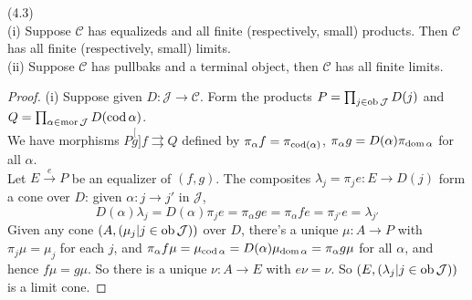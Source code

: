\documentclass[a4paper]{article}
\begin{document}
\begin{thm} (4.3)\\
    (i) Suppose $\mathcal{C}$ has equalizeds and all finite (respectively, small) products. Then $\mathcal{C}$ has all finite (respectively, small) limits.\\
    (ii) Suppose $\mathcal{C}$ has pullbaks and a terminal object, then $\mathcal{C}$ has all finite limits.
    \begin{proof}
        (i) Suppose given $D:\mathcal{J} \to \mathcal{C}$. Form the products $P=\prod_{j \in \operatorname{ob}\mathcal{J}} D(j)$ and $Q = \prod_{\alpha \in \operatorname{mor}\mathcal{J}} D(\operatorname{cod} \alpha)$.\\
        We have morphisms $P \stackrel[g]{f}{\rightrightarrows} Q$ defined by $\pi_\alpha f = \pi_{\operatorname{cod}(\alpha)}$, $\pi_\alpha g = D(\alpha) \pi_{\operatorname{dom} \alpha}$ for all $\alpha$.\\
        Let $E \xrightarrow{e} P$ be an equalizer of $(f,g)$. The composites $\lambda_j = \pi_j e: E \to D(j)$ form a cone over $D$: given $\alpha: j \to j'$ in $\mathcal{J}$, 
        $$D(\alpha) \lambda_j = D(\alpha) \pi_j e = \pi_\alpha ge = \pi_\alpha fe = \pi_{j'} e = \lambda_{j'}$$
        Given any cone $(A,(\mu_j | j \in \operatorname{ob}\mathcal{J}))$ over $D$, there's a unique $\mu:A \to P$ with $\pi_j \mu = \mu_j$ for each $j$, and $\pi_\alpha f \mu = \mu_{\operatorname{cod} \alpha} = D(\alpha) \mu_{\operatorname{dom} \alpha} = \pi_\alpha g\mu$ for all $\alpha$, and hence $f\mu = g\mu$. So there is a unique $\nu:A \to E$ with $e\nu = \nu$. So $(E,(\lambda_j | j \in \operatorname{ob} \mathcal{J}))$ is a limit cone.


\end{proof}
\end{thm}
\end{document}
